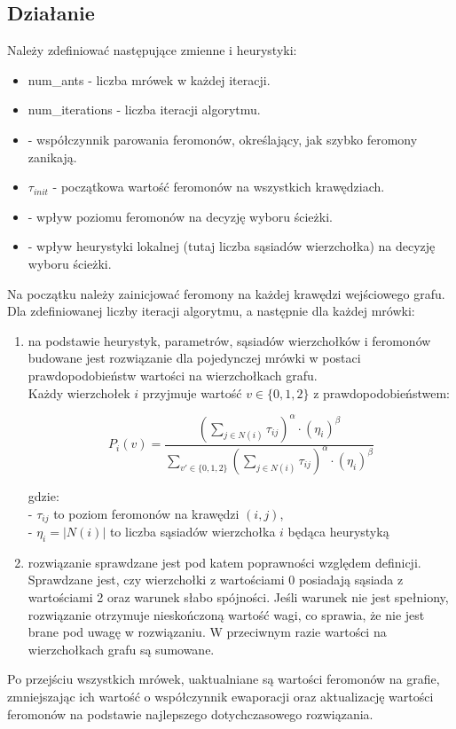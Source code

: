 \subsection{Działanie}
Należy zdefiniować następujące zmienne i heurystyki:
\begin{itemize}
    \item num\_ants - liczba mrówek w każdej iteracji.
    \item num\_iterations - liczba iteracji algorytmu.
    \item \textbf{\rho} - współczynnik parowania feromonów, określający, jak szybko feromony zanikają.
    \item $\tau_{init}$ - początkowa wartość feromonów na wszystkich krawędziach.
    \item \textbf{\alpha} - wpływ poziomu feromonów na decyzję wyboru ścieżki.
    \item \textbf{\beta} - wpływ heurystyki lokalnej (tutaj liczba sąsiadów wierzchołka) na decyzję wyboru ścieżki.
\end{itemize}
Na początku należy zainicjować feromony na każdej krawędzi wejściowego grafu.\\
Dla zdefiniowanej liczby iteracji algorytmu, a następnie dla każdej mrówki:
\begin{enumerate}
    \item na podstawie heurystyk, parametrów, sąsiadów wierzchołków i feromonów budowane jest rozwiązanie dla pojedynczej mrówki w postaci prawdopodobieństw wartości na wierzchołkach grafu.\\
    Każdy wierzchołek \( i \) przyjmuje wartość \( v \in \{0,1,2\} \) z prawdopodobieństwem:

\[
P_i(v) = \frac{ \left( \sum\limits_{j \in N(i)} \tau_{ij} \right)^\alpha \cdot (\eta_i)^\beta }
{\sum\limits_{v' \in \{0,1,2\}} \left( \sum\limits_{j \in N(i)} \tau_{ij} \right)^\alpha \cdot (\eta_i)^\beta}
\]

gdzie:\\
- \( \tau_{ij} \) to poziom feromonów na krawędzi \( (i,j) \),\\
- \( \eta_i = |N(i)| \) to liczba sąsiadów wierzchołka \( i \) będąca heurystyką

    \item rozwiązanie sprawdzane jest pod katem poprawności względem definicji. Sprawdzane jest, czy wierzchołki z wartościami 0 posiadają sąsiada z wartościami 2 oraz warunek słabo spójności. Jeśli warunek nie jest spełniony, rozwiązanie otrzymuje nieskończoną wartość wagi, co sprawia, że nie jest brane pod uwagę w rozwiązaniu. W przeciwnym razie wartości na wierzchołkach grafu są sumowane.
\end{enumerate}
Po przejściu wszystkich mrówek, uaktualniane są wartości feromonów na grafie, zmniejszając ich wartość o współczynnik ewaporacji oraz aktualizację wartości feromonów na podstawie najlepszego dotychczasowego rozwiązania.

